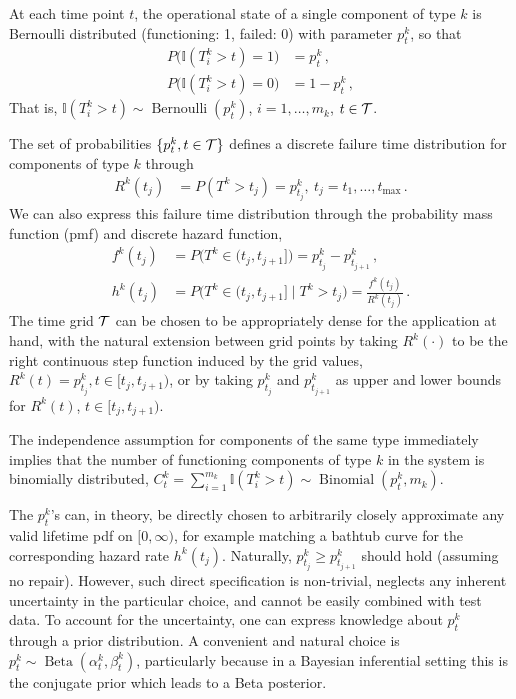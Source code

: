 \documentclass[12pt, a4paper]{elsarticle}
\newcommand{\indic}{\mathbb{I}}
\newcommand{\ber}{\operatorname{Bernoulli}}
\newcommand{\bin}{\operatorname{Binomial}}
\newcommand{\be}{\operatorname{Beta}}
\def\tmax{t_\text{max}}
\newcommand{\ptk}{p^k_t}
\newcommand{\td}[1]{%
  \iftoggle{td}{%
    \todo[inline]{#1}%
  }{}%
}
\begin{document}
At each time point $t$, the operational state of a single component of type $k$
is Bernoulli distributed (functioning: 1, failed: 0) with parameter $\ptk$, so that
\begin{align*}
P\big(\indic(T^k_i > t) = 1\big) &= \ptk\,, \\
P\big(\indic(T^k_i > t) = 0\big) &= 1 - \ptk\,,
\end{align*}
That is, $\indic(T^k_i > t) \sim \ber(\ptk)$, $i = 1, \ldots, m_k$, $t \in {\cal T}$.

The set of probabilities $\{ \ptk, t \in {\cal T}\}$
defines a discrete failure time distribution for components of type $k$ through
\begin{align*}
R^k(t_j) &= P(T^k > t_j) = p^k_{t_j},\ t_j = t_1, \ldots, \tmax\,.
\end{align*}
We can also express this failure time distribution through the probability mass function (pmf) and discrete hazard function,
\begin{align*}
f^k(t_j) &= P\big(T^k \in (t_j,t_{j+1}]\big) = p^k_{t_j} - p^k_{t_{j+1}}\,,\\ 
h^k(t_j) &= P\big(T^k \in (t_j,t_{j+1}]\mid T^k > t_j\big) = \frac{f^k(t_j)}{R^k(t_j)}\,. %
\end{align*}
The time grid $\cal T$ can be chosen to be appropriately dense for the application at hand,
with the natural extension between grid points by taking $R^k(\cdot)$ to be the right continuous step function induced by the grid values,
$R^k(t) = p^k_{t_j}, t \in [t_j, t_{j+1})$,
or by taking $p^k_{t_j}$ and $p^k_{t_{j+1}}$ as upper and lower bounds for $R^k(t)$, $t \in [t_j, t_{j+1})$.

\td{***illustrate discrete distribution with a graph of R, f, h?***}

The independence assumption for components of the same type immediately implies that 
the number of functioning components of type $k$ in the system
is binomially distributed, $C^k_t = \sum_{i=1}^{m_k} \indic(T^k_i > t) \sim \bin(\ptk, m_k)$.

The $\ptk$'s can, in theory, be directly chosen to arbitrarily closely approximate any valid lifetime pdf on
$[0,\infty)$, for example matching a bathtub curve for the corresponding hazard rate $h^k(t_j)$.
Naturally, $p^k_{t_j} \ge p^k_{t_{j+1}}$ should hold (assuming no repair).
However, such direct specification is non-trivial, neglects any inherent uncertainty in the particular choice, and cannot be 
easily combined with test data.
To account for the uncertainty, one can express knowledge about $\ptk$ through a prior distribution.
A convenient and natural choice is $\ptk \sim \be(\alpha^k_t, \beta^k_t)$, particularly because in a Bayesian inferential
setting this is the conjugate prior which leads to a Beta posterior.
\end{document}
